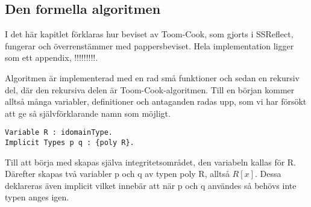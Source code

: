 \subsection{Den formella algoritmen}
I det här kapitlet förklaras hur beviset av Toom-Cook, som gjorts i SSReflect,
fungerar och överrenstämmer med pappersbeviset. Hela implementation ligger som
ett appendix, !!!!!!!!!.

Algoritmen är implementerad med en rad små funktioner och sedan en rekursiv
del, där den rekursiva delen är Toom-Cook-algoritmen. Till en början kommer
alltså många variabler, definitioner och antaganden radas upp, som vi har
försökt att ge så självförklarande namn som möjligt.
\begin{lstlisting}
Variable R : idomainType.
Implicit Types p q : {poly R}.
\end{lstlisting}
Till att börja med skapas själva integritetsområdet, den variabeln kallas för
R. Därefter skapas två variabler p och q av typen poly R, alltså $R[x]$. Dessa
deklareras även implicit vilket innebär att när p och q användes så behövs inte
typen anges igen.

